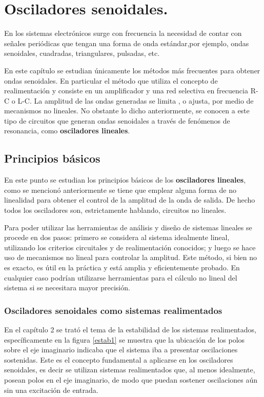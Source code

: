 \chapter{Osciladores senoidales.}\label{osc}


\hspace{10pt} En los sistemas electrónicos surge con frecuencia la necesidad de
contar con señales periódicas que tengan una forma de onda
estándar,por ejemplo, ondas senoidales, cuadradas, triangulares,
pulsadas, etc.

En este capítulo se estudian únicamente los métodos más frecuentes
para obtener ondas senoidales. En particular el método que utiliza
el concepto de realimentación y consiste en un amplificador y una
red selectiva en frecuencia R-C o L-C. La amplitud de las ondas
generadas se limita , o ajusta, por medio de mecanismos no lineales.
No obstante lo dicho anteriormente, se conocen a este tipo de
circuitos que generan ondas senoidales a través de fenómenos de
resonancia, como \textbf{osciladores lineales}.

\section{Principios básicos}

\hspace{10pt} En este punto se estudian los principios básicos de los
\textbf{osciladores lineales}, como se mencionó anteriormente se
tiene que emplear alguna forma de no linealidad para obtener el
control de la amplitud de la onda de salida. De hecho todos los
osciladores son, estrictamente hablando, circuitos no lineales.

Para poder utilizar las herramientas de análisis y diseño de
sistemas lineales se procede en dos pasos: primero se considera al
sistema idealmente lineal, utilizando los criterios circuitales y de
realimentación conocidos; y luego se hace uso de mecanismos no
lineal para controlar la amplitud. Este método, si bien no es
exacto, es útil en la práctica y está amplia y eficientemente
probado. En cualquier caso podrían utilizarse herramientas para el
cálculo no lineal del sistema si se necesitara mayor precisión.


\subsection{Osciladores senoidales como sistemas realimentados}

\hspace{10pt} En el capítulo 2 se trató el tema de la estabilidad de los sistemas
realimentados, específicamente en la figura \ref{estab1} se muestra
que la ubicación de los polos sobre el eje imaginario indicaba que
el sistema iba a presentar oscilaciones sostenidas. Este es el
concepto fundamental a aplicarse en los osciladores senoidales, es
decir se utilizan sistemas realimentados que, al menos idealmente,
posean polos en el eje imaginario, de modo que puedan sostener
oscilaciones aún sin una excitación de entrada.

